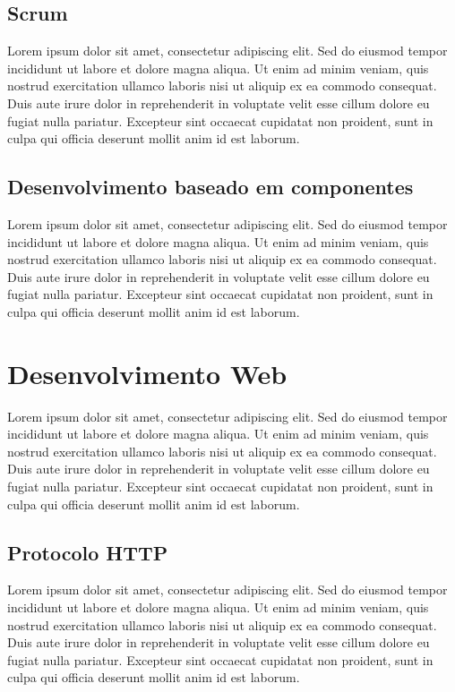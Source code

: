 \documentclass[
	12pt,				    %
	openright,			    %
	oneside,			    %
	a4paper,			    %
    sumario=tradicional,    %
	english,			    %
	brazilian,				    %
	]{abntex2}
\begin{document}
\subsection{Scrum}

Lorem ipsum dolor sit amet, consectetur adipiscing elit. Sed do eiusmod tempor incididunt ut labore et dolore magna aliqua. Ut enim ad minim veniam, quis nostrud exercitation ullamco laboris nisi ut aliquip ex ea commodo consequat. Duis aute irure dolor in reprehenderit in voluptate velit esse cillum dolore eu fugiat nulla pariatur. Excepteur sint occaecat cupidatat non proident, sunt in culpa qui officia deserunt mollit anim id est laborum.

\subsection{Desenvolvimento baseado em componentes}

Lorem ipsum dolor sit amet, consectetur adipiscing elit. Sed do eiusmod tempor incididunt ut labore et dolore magna aliqua. Ut enim ad minim veniam, quis nostrud exercitation ullamco laboris nisi ut aliquip ex ea commodo consequat. Duis aute irure dolor in reprehenderit in voluptate velit esse cillum dolore eu fugiat nulla pariatur. Excepteur sint occaecat cupidatat non proident, sunt in culpa qui officia deserunt mollit anim id est laborum.

\section{Desenvolvimento Web}

Lorem ipsum dolor sit amet, consectetur adipiscing elit. Sed do eiusmod tempor incididunt ut labore et dolore magna aliqua. Ut enim ad minim veniam, quis nostrud exercitation ullamco laboris nisi ut aliquip ex ea commodo consequat. Duis aute irure dolor in reprehenderit in voluptate velit esse cillum dolore eu fugiat nulla pariatur. Excepteur sint occaecat cupidatat non proident, sunt in culpa qui officia deserunt mollit anim id est laborum.

\subsection{Protocolo HTTP}

Lorem ipsum dolor sit amet, consectetur adipiscing elit. Sed do eiusmod tempor incididunt ut labore et dolore magna aliqua. Ut enim ad minim veniam, quis nostrud exercitation ullamco laboris nisi ut aliquip ex ea commodo consequat. Duis aute irure dolor in reprehenderit in voluptate velit esse cillum dolore eu fugiat nulla pariatur. Excepteur sint occaecat cupidatat non proident, sunt in culpa qui officia deserunt mollit anim id est laborum.
\end{document}

